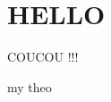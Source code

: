 \documentclass[11pt]{book}
\begin{document}
    \chapter{HELLO}

    COUCOU !!!




    \begin{definition}[my def]
        \lipsum
    \end{definition}


    \begin{theoreme}[label = thrm:X]{my theo}
        \lipsum
    \end{theoreme}

    \begin{demo}{}{}
        \lipsum
    \end{demo}

    \begin{ajoutationV}{}{}
        \lipsum
    \end{ajoutationV}






    \cleardoublepage%
    \appendix
    \pagestyle{back} %
    \backmatter


    \printbibliography
    \nocite{*}


    \listoffigures

    \tableofcontents%
\end{document}
